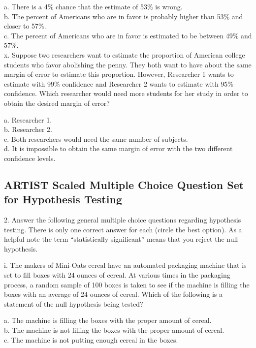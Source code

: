 \documentclass[11pt]{isuthesis}\usepackage[]{graphicx}\usepackage[]{color}
\begin{document}
\begin{appendices}
a. There is a 4\% chance that the estimate of 53\% is wrong.\\
b. The percent of Americans who are in favor is probably higher than 53\% and closer to 57\%.\\
c. The percent of Americans who are in favor is estimated to be between 49\% and 57\%.\\

x. Suppose two researchers want to estimate the proportion of American college students who favor abolishing the penny. They both want to have about the same margin of error to estimate this proportion. However, Researcher 1 wants to estimate with 99\% confidence and Researcher 2 wants to estimate with 95\% confidence. Which researcher would need more students for her study in order to obtain the desired margin of error?

a. Researcher 1.\\
b. Researcher 2.\\
c. Both researchers would need the same number of subjects.\\
d. It is impossible to obtain the same margin of error with the two different confidence levels.\\

\subsection{ARTIST Scaled Multiple Choice Question Set for Hypothesis Testing}

2.   Answer the following general multiple choice questions regarding hypothesis testing.  There is only one correct answer for each (circle the best option).  As a helpful note the term ``statistically significant'' means that you reject the null hypothesis.

i. The makers of Mini-Oats cereal have an automated packaging machine that is set to fill boxes with 24 ounces of cereal. At various times in the packaging process, a random sample of 100 boxes is taken to see if the machine is filling the boxes with an average of 24 ounces of cereal. Which of the following is a statement of the null hypothesis being tested?

a. The machine is filling the boxes with the proper amount of cereal.\\
b. The machine is not filling the boxes with the proper amount of cereal.\\
c. The machine is not putting enough cereal in the boxes.\\


\end{appendices}
\end{document}
